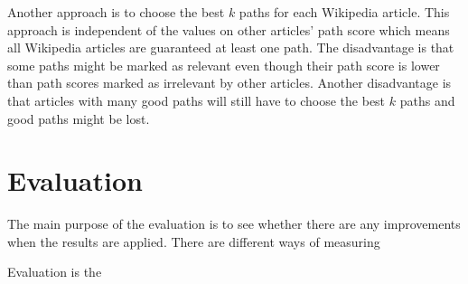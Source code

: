 
Another approach is to choose the best $k$ paths for each Wikipedia article. This approach is independent of the values on other articles' path score which means all Wikipedia articles are guaranteed at least one path. The disadvantage is that some paths might be marked as relevant even though their path score is lower than path scores marked as irrelevant by other articles. Another disadvantage is that articles with many good paths will still have to choose the best $k$ paths and good paths might be lost. 

\section{Evaluation}
The main purpose of the evaluation is to see whether there are any improvements when the results are applied. There are different ways of measuring 


Evaluation is the 